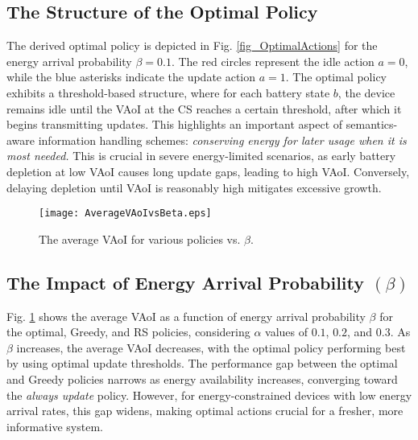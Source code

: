 \documentclass[lettersize,journal]{IEEEtran}
\begin{document}
    \subsection{The Structure of the Optimal Policy}
    The derived optimal policy is depicted in Fig. \ref{fig_OptimalActions} for the energy arrival probability $\beta=0.1$. The red circles represent the idle action $a=0$, while the blue asterisks indicate the update action $a=1$. The optimal policy exhibits a threshold-based structure, where for each battery state $b$, the device remains idle until the VAoI at the CS reaches a certain threshold, after which it begins transmitting updates. This highlights an important aspect of semantics-aware information handling schemes: \emph{conserving energy for later usage when it is most needed.} This is crucial in severe energy-limited scenarios, as early battery depletion at low VAoI causes long update gaps, leading to high VAoI. Conversely, delaying depletion until VAoI is reasonably high mitigates excessive growth.

    \begin{figure}[tb!]
		\centering
		\texttt{[image: AverageVAoIvsBeta.eps]}
		\caption{The average VAoI for various policies vs. $\beta$.}
        \vspace{-8pt}
		\label{fig_VAoIvsBeta}
    \end{figure}

    \subsection{The Impact of Energy Arrival Probability $(\beta)$}

    Fig. \ref{fig_VAoIvsBeta} shows the average VAoI as a function of energy arrival probability $\beta$ for the optimal, Greedy, and RS policies, considering $\alpha$ values of $0.1$, $0.2$, and $0.3$. As $\beta$ increases, the average VAoI decreases, with the optimal policy performing best by using optimal update thresholds. The performance gap between the optimal and Greedy policies narrows as energy availability increases, converging toward the \emph{always update} policy. However, for energy-constrained devices with low energy arrival rates, this gap widens, making optimal actions crucial for a fresher, more informative system.
    
\end{document}
